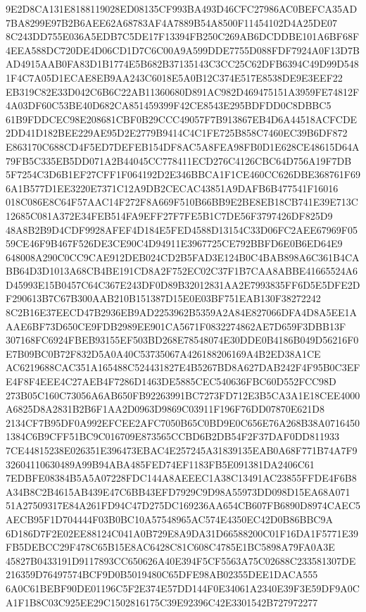 \documentclass[UTF8,fontset=fandol,zihao=-4,a4paper]{ctexart}
\begin{document}
{{9E2D8CA131E8188119028ED08135CF993BA493D46CFC27986AC0BEFCA35AD7BA8299E97B2B6AEE62A68783AF4A7889B54A8500F11454102D4A25DE07
8C243DD755E036A5EDB7C5DE17F13394FB250C269AB6DCDDBE101A6BF68F4EEA588DC720DE4D06CD1D7C6C00A9A599DDE7755D088FDF7924A0F13D7B
AD4915AAB0FA83D1B1774E5B682B37135143C3CC25C62DFB6394C49D99D5481F4C7A05D1ECAE8EB9AA243C6018E5A0B12C374E517E8538DE9E3EEF22
EB319C82E33D042C6B6C22AB11360680D891AC982D469475151A3959FE74812F4A03DF60C53BE40D682CA851459399F42CE8543E295BDFDD0C8DBBC5
61B9FDDCEC98E208681CBF0B29CCC49057F7B913867EB4D6A44518ACFCDE2DD41D182BEE229AE95D2E2779B9414C4C1FE725B858C7460EC39B6DF872
E863170C688CD4F5ED7DEFEB154DF8AC5A8FEA98FB0D1E628CE48615D64A79FB5C335EB5DD071A2B44045CC778411ECD276C4126CBC64D756A19F7DB
5F7254C3D6B1EF27CFF1F064192D2E346BBCA1F1CE460CC626DBE368761F696A1B577D1EE3220E7371C12A9DB2CECAC43851A9DAFB6B477541F16016
018C086E8C64F57AAC14F272F8A669F510B66BB9E2BE8EB18CB741E39E713C12685C081A372E34FEB514FA9EFF27F7FE5B1C7DE56F3797426DF825D9
48A8B2B9D4CDF9928AFEF4D184E5FED4588D13154C33D06FC2AEE67969F0559CE46F9B467F526DE3CE90C4D94911E3967725CE792BBFD6E0B6ED64E9
648008A290C0CC9CAE912DEB024CD2B5FAD3E124B0C4BAB898A6C361B4CABB64D3D1013A68CB4BE191CD8A2F752EC02C37F1B7CAA8ABBE41665524A6
D45993E15B0457C64C367E243DF0D89B32012831AA2E7993835FF6D5E5DFE2DF290613B7C67B300AAB210B151387D15E0E03BF751EAB130F38272242
8C2B16E37EECD47B2936EB9AD2253962B5359A2A84E827066DFA4D8A5EE1AAAE6BF73D650CE9FDB2989EE901CA5671F0832274862AE7D659F3DBB13F
307168FC6924FBEB93155EF503BD268E78548074E30DDE0B4186B049D56216F0E7B09BC0B72F832D5A0A40C53735067A426188206169A4B2ED38A1CE
AC6219688CAC351A165488C524431827E4B5267BD8A627DAB242F4F95B0C3EFE4F8F4EEE4C27AEB4F7286D1463DE5885CEC540636FBC60D552FCC98D
273B05C160C73056A6AB650FB92263991BC7273FD712E3B5CA3A1E18CEE4000A6825D8A2831B2B6F1AA2D0963D9869C03911F196F76DD07870E621D8
2134CF7B95DF0A992EFCEE2AFC7050B65C0BD9E0C656E76A268B38A07164501384C6B9CFF51BC9C016709E873565CCBD6B2DB54F2F37DAF0DD811933
7CE44815238E026351E396473EBAC4E257245A31839135EAB0A68F771B74A7F932604110630489A99B94ABA485FED74EF1183FB5E091381DA2406C61
7EDBFE08384B5A5A07228FDC144A8AEEEC1A38C13491AC23855FFDE4F6B8A34B8C2B4615AB439E47C6BB43EFD7929C9D98A55973DD098D15EA68A071
51A27509317E84A261FD94C47D275DC169236AA654CB607FB6890D8974CAEC5AECB95F1D704444F03B0BC10A57548965AC574E4350EC42D0B86BBC9A
6D186D7F2E02EE88124C041A0B729E8A9DA31D66588200C01F16DA1F5771E39FB5DEBCC29F478C65B15E8AC6428C81C608C4785E1BC5898A79FA0A3E
45827B0433191D9117893CC650626A40E394F5CF5563A75C02688C233581307DE216359D76497574BCF9D0B5019480C65DFE98AB02355DEE1DACA555
6A0C61BEBF90DE01196C5F2E374E57DD144F0E34061A2340E39F3E59DF9A0CA1F1B8C03C925EE29C1502816175C39E92396C42E3301542B727972277
}}
\end{document}

